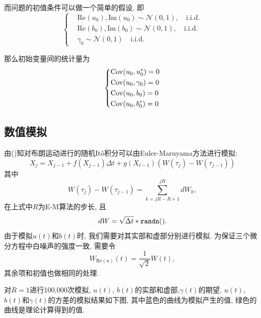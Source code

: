 \documentclass[notitlepage,cs4size,punct,oneside]{ctexrep}
\numberwithin{equation}{section}
\theoremstyle{mystyle}
\begin{document}
而问题的初值条件可以做一个简单的假设, 即
\begin{equation}
\left\{
\begin{aligned}
&\text{Re}(u_0), \text{Im}(u_0) \sim \mathcal{N}(0, 1), \quad \text{i.i.d.} \\
&\text{Re}(b_0), \text{Im}(b_0) \sim \mathcal{N}(0, 1), \quad \text{i.i.d.} \\
&\gamma_0 \sim \mathcal{N}(0, 1) \quad \text{i.i.d.}
\end{aligned}
\right.
\end{equation}

那么初始变量间的统计量为
\begin{equation}
\left\{
\begin{aligned}
&\text{Cov}(u_0, u_0^*) = 0 \\
&\text{Cov}(u_0, \gamma_0) = 0 \\
&\text{Cov}(u_0, b_0) = 0 \\
&\text{Cov}(u_0, b_0^*) = 0
\end{aligned}
\right.
\end{equation}

\subsection{数值模拟}
由(\cite{higham2001algorithmic})知对布朗运动进行的随机It\^o积分可以由Euler-Maruyama方法进行模拟\cite{higham2000mean}:
\begin{equation}
X_j = X_{j-1}+f(X_{j-1})\Delta t+g(X_{t-1})(W(\tau_j) - W(\tau_{j-1}))
\end{equation}
其中
$$
W(\tau_j) - W(\tau_{j-1}) = \sum_{k = jR-R+1}^{jR} dW_k,
$$
在上式中$R$为E-M算法的步长, 且
$$
dW = \sqrt{\Delta t}*\tt{randn()}.
$$
由于模拟$u(t)$和$b(t)$时, 我们需要对其实部和虚部分别进行模拟. 为保证三个微分方程中白噪声的强度一致, 需要令
$$W_{\text{Re}(u)}(t) = \frac{1}{\sqrt{2}}W(t),$$
其余项和初值也做相同的处理.

\quad 对$R=1$进行100,000次模拟\cite{robert2004monte}, $u(t)$, $b(t)$的实部和虚部,$\gamma(t)$的期望, $u(t)$, $b(t)$和$\gamma(t)$的方差的模拟结果如下图\cite{mckinney2012python}\cite{hunter2007matplotlib}, 其中蓝色的曲线为模拟产生的值, 绿色的曲线是理论计算得到的值. \\

\end{document}
